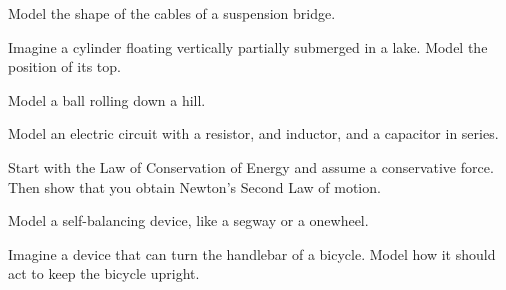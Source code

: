 \begin{exercises}
\begin{problist}
	\prob Model the shape of the cables of a suspension bridge.
	
	\prob Imagine a cylinder floating vertically partially submerged in a lake. Model the position of its top.
	
	\prob Model a ball rolling down a hill.
	
	\prob Model an electric circuit with a resistor, and inductor, and a capacitor in series.
	
	\prob Start with the Law of Conservation of Energy and assume a conservative force. Then show that you obtain Newton's Second Law of motion.
	
	\prob Model a self-balancing device, like a segway or a onewheel.
	
	\prob Imagine a device that can turn the handlebar of a bicycle. Model how it should act to keep the bicycle upright.
	
	
	\end{problist}
\end{exercises}
